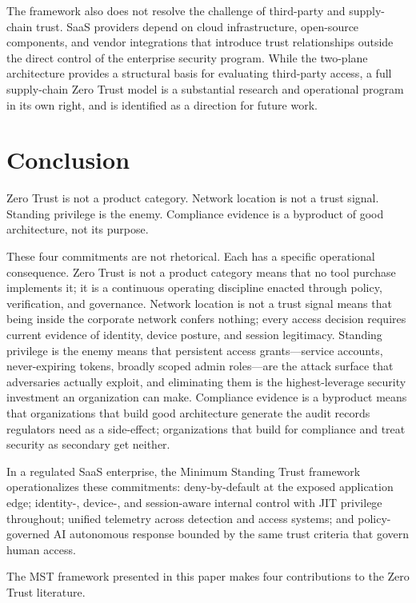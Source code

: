 \documentclass[unnumsec,webpdf,contemporary,large]{oup-authoring-template}
\theoremstyle{thmstyleone}
\theoremstyle{thmstyletwo}
\theoremstyle{thmstylethree}
\begin{document}
The framework also does not resolve the challenge of third-party and supply-chain trust.
SaaS providers depend on cloud infrastructure, open-source components, and vendor integrations
that introduce trust relationships outside the direct control of the enterprise security
program. While the two-plane architecture provides a structural basis for evaluating
third-party access, a full supply-chain Zero Trust model is a substantial research and
operational program in its own right, and is identified as a direction for future work.

\section{Conclusion}

Zero Trust is not a product category. Network location is not a trust signal.
Standing privilege is the enemy. Compliance evidence is a byproduct of good
architecture, not its purpose.

These four commitments are not rhetorical. Each has a specific operational consequence.
Zero Trust is not a product category means that no tool purchase implements it;
it is a continuous operating discipline enacted through policy, verification, and
governance. Network location is not a trust signal means that being inside the
corporate network confers nothing; every access decision requires current evidence
of identity, device posture, and session legitimacy. Standing privilege is the enemy
means that persistent access grants---service accounts, never-expiring tokens,
broadly scoped admin roles---are the attack surface that adversaries actually
exploit, and eliminating them is the highest-leverage security investment an
organization can make. Compliance evidence is a byproduct means that organizations
that build good architecture generate the audit records regulators need as a
side-effect; organizations that build for compliance and treat security as secondary
get neither.

In a regulated SaaS enterprise, the Minimum Standing Trust framework operationalizes
these commitments: deny-by-default at the exposed application edge; identity-,
device-, and session-aware internal control with JIT privilege throughout; unified
telemetry across detection and access systems; and policy-governed AI autonomous
response bounded by the same trust criteria that govern human access.

The MST framework presented in this paper makes four contributions to the Zero Trust
literature.
\end{document}
